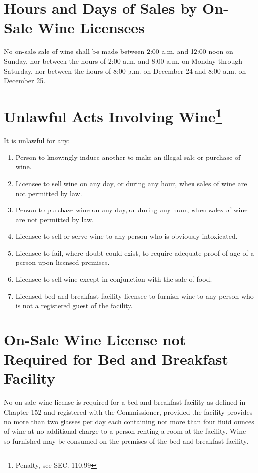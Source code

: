 \section{Hours and Days of Sales by On-Sale Wine Licensees}
No on-sale sale of wine shall be made between 2:00 a.m. and 12:00 noon on Sunday, nor between the hours of 2:00 a.m. and 8:00 a.m. on Monday through Saturday, nor between the hours of 8:00 p.m. on December 24 and 8:00 a.m. on December 25.

\section{Unlawful Acts Involving Wine\footnote{Penalty, see SEC. 110.99}}
It is unlawful for any:
\begin{enumerate}[{\indent}A)]
    \item Person to knowingly induce another to make an illegal sale or purchase of wine.
    \item Licensee to sell wine on any day, or during any hour, when sales of wine are not permitted by law.
    \item Person to purchase wine on any day, or during any hour, when sales of wine are not permitted by law.
    \item Licensee to sell or serve wine to any person who is obviously intoxicated.
    \item Licensee to fail, where doubt could exist, to require adequate proof of age of a person upon licensed premises.
    \item Licensee to sell wine except in conjunction with the sale of food.
    \item Licensed bed and breakfast facility licensee to furnish wine to any person who is not a registered guest of the facility.
\end{enumerate}

\section{On-Sale Wine License not Required for Bed and Breakfast Facility}
No on-sale wine license is required for a bed and breakfast facility as defined in Chapter 152 and registered with the Commissioner, provided the facility provides no more than two glasses per day each containing not more than four fluid ounces of wine at no additional charge to a person renting a room at the facility.  Wine so furnished may be consumed on the premises of the bed and breakfast facility.\\

